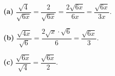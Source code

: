 \textbf{(a)} $\dfrac{\sqrt4}{\sqrt{6x}}=\dfrac{2}{\sqrt{6x}}=\dfrac{2\sqrt{6x}}{6x}=\boxed{\dfrac{\sqrt{6x}}{3x}}$.

\textbf{(b)} $\dfrac{\sqrt{4x}}{\sqrt6}=\dfrac{2\sqrt x\cdot\sqrt6}{6}=\boxed{\dfrac{\sqrt{6x}}{3}}$.

\textbf{(c)} $\dfrac{\sqrt{6x}}{\sqrt4}=\boxed{\dfrac{\sqrt{6x}}{2}}$.
